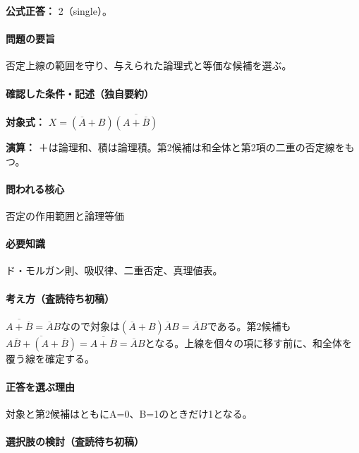 \textbf{公式正答：} 2（single）。

\paragraph{問題の要旨} 否定上線の範囲を守り、与えられた論理式と等価な候補を選ぶ。

\paragraph{確認した条件・記述（独自要約）}\mbox{}\par

\noindent\textbf{対象式：} \(X=(\overline A+B)\overline{(A+\overline B)}\)\par

\noindent\textbf{演算：} ＋は論理和、積は論理積。第2候補は和全体と第2項の二重の否定線をもつ。\par

\paragraph{問われる核心} 否定の作用範囲と論理等価

\paragraph{必要知識} ド・モルガン則、吸収律、二重否定、真理値表。

\paragraph{考え方（査読待ち初稿）} \(\overline{A+\overline B}=\overline A B\)なので対象は\((\overline A+B)\overline A B=\overline A B\)である。第2候補も\(\overline{A\overline B+(A+\overline B)}=\overline{A+\overline B}=\overline A B\)となる。上線を個々の項に移す前に、和全体を覆う線を確定する。

\paragraph{正答を選ぶ理由} 対象と第2候補はともにA=\allowbreak{}0、B=\allowbreak{}1のときだけ1となる。

\paragraph{選択肢の検討（査読待ち初稿）}\mbox{}\par

